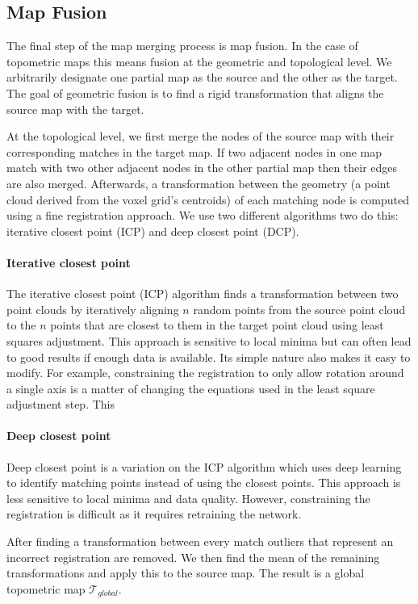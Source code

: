 \subsection{Map Fusion}
The final step of the map merging process is map fusion. In the case of topometric maps this means fusion at the geometric and topological level. We arbitrarily designate one partial map as the source and the other as the target. The goal of geometric fusion is to find a rigid transformation that aligns the source map with the target. 

At the topological level, we first merge the nodes of the source map with their corresponding matches in the target map. If two adjacent nodes in one map match with two other adjacent nodes in the other partial map then their edges are also merged. Afterwards, a transformation between the geometry (a point cloud derived from the voxel grid's centroids) of each matching node is computed using a fine registration approach. We use two different algorithms two do this: iterative closest point (ICP) and deep closest point (DCP).

\paragraph{Iterative closest point}
The iterative closest point (ICP) algorithm finds a transformation between two point clouds by iteratively aligning \(n\) random points from the source point cloud to the \(n\) points that are closest to them in the target point cloud using least squares adjustment. This approach is sensitive to local minima but can often lead to good results if enough data is available. Its simple nature also makes it easy to modify. For example, constraining the registration to only allow rotation around a single axis is a matter of changing the equations used in the least square adjustment step. This

\paragraph{Deep closest point}
Deep closest point is a variation on the ICP algorithm which uses deep learning to identify matching points instead of using the closest points. This approach is less sensitive to local minima and data quality. However, constraining the registration is difficult as it requires retraining the network.

After finding a transformation between every match outliers that represent an incorrect registration are removed. We then find the mean of the remaining transformations and apply this to the source map. The result is a global topometric map \(\mathcal{T}_{global}\).